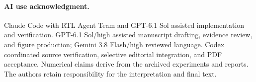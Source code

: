 \paragraph{AI use acknowledgment.}
Claude Code with RTL Agent Team and GPT-6.1 Sol assisted implementation and verification. GPT-6.1 Sol/high assisted manuscript drafting, evidence review, and figure production; Gemini 3.8 Flash/high reviewed language. Codex coordinated source verification, selective editorial integration, and PDF acceptance. Numerical claims derive from the archived experiments and reports. The authors retain responsibility for the interpretation and final text.
